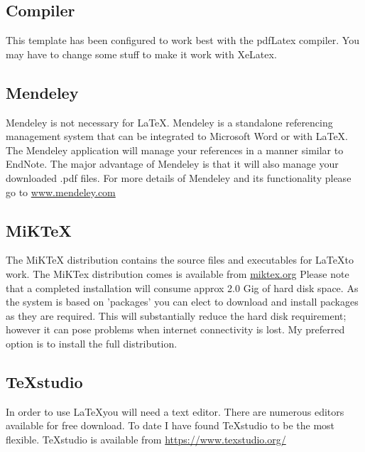 \subsection{Compiler}

This template has been configured to work best with the pdfLatex compiler.  You may have to change some stuff to make it work with XeLatex.


\subsection{Mendeley}

Mendeley is not necessary for \LaTeX.  Mendeley is a standalone referencing management system that can be integrated to Microsoft Word or with \LaTeX.  The Mendeley application will manage your references in a manner similar to EndNote.  The major advantage of Mendeley is that it will also manage your downloaded .pdf files.  For more details of Mendeley and its functionality please go to \href{http://www.mendeley.com/}{www.mendeley.com} 





\subsection{MiKTeX}

The MiKTeX distribution contains the source files and executables for \LaTeX  to work.  The MiKTex distribution comes is available  from \href{http://miktex.org/}{miktex.org}  Please note that a completed installation will consume approx 2.0 Gig of hard disk space.  As the system is based on 'packages' you can elect to download and install packages as they are required.  This will substantially reduce the hard disk requirement; however it can pose problems when internet connectivity is lost.  My preferred option is to install the full distribution.  


\subsection{TeXstudio}

In order to use \LaTeX you will need a text editor.  There are numerous editors available for free download.  To date I have found TeXstudio to be the most flexible.  TeXstudio is available from  \href{https://www.texstudio.org/}{https://www.texstudio.org/} 






